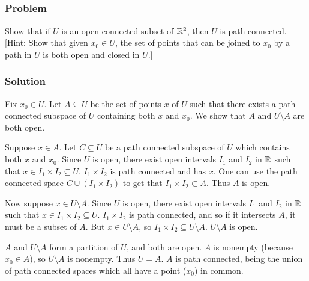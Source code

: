 
\setcounter{subsection}{9} %
\subsection{}

\subsubsection{Problem}
Show that if $U$ is an open connected subset of $\mathbb R^2$, then $U$ is path connected. [Hint: Show that given $x_0 \in U$, the set of points that can be joined to $x_0$ by a path in $U$ is both open and closed in $U$.]

\subsubsection{Solution}
Fix $x_0 \in U$. Let $A \subseteq U$ be the set of points $x$ of $U$ such that there exists a path connected subspace of $U$ containing both $x$ and $x_0$. We show that $A$ and $U \setminus A$ are both open.

Suppose $x \in A$. Let $C \subseteq U$ be a path connected subspace of $U$ which contains both $x$ and $x_0$. Since $U$ is open, there exist open intervals $I_1$ and $I_2$ in $\mathbb R$ such that $x \in I_1 \times I_2 \subseteq U$. $I_1 \times I_2$ is path connected and has $x$. One can use the path connected space $C \cup (I_1 \times I_2)$ to get that $I_1 \times I_2 \subset A$. Thus $A$ is open.

Now suppose $x \in U \setminus A$. Since $U$ is open, there exist open intervals $I_1$ and $I_2$ in $\mathbb R$ such that $x \in I_1 \times I_2 \subseteq U$. $I_1 \times I_2$ is path connected, and so if it intersects $A$, it must be a subset of $A$. But $x \in U \setminus A$, so $I_1 \times I_2 \subseteq U \setminus A$. $U \setminus A$ is open.

$A$ and $U \setminus A$ form a partition of $U$, and both are open. $A$ is nonempty (because $x_0 \in A$), so $U \setminus A$ is nonempty. Thus $U = A$. $A$ is path connected, being the union of path connected spaces which all have a point ($x_0$) in common.
